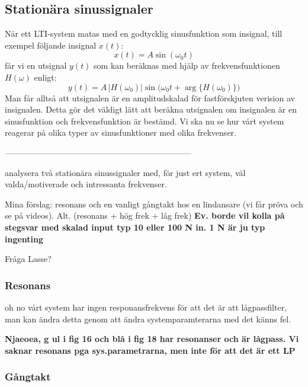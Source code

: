 \subsection{Stationära sinussignaler}
När ett LTI-system matas med en godtycklig sinusfunktion som insignal, till exempel följande insignal $x(t)$:
$$x(t)=A\sin(\omega_0t)$$
får vi en utsignal $y(t)$ som kan beräknas med hjälp av frekvensfunktionen $H(\omega)$ enligt:
$$y(t)=A\,\big|H(\omega_0)\big|\sin\big(\omega_0t+\arg\big\{H(\omega_0)\big\}\big)$$
Man får alltså att utsignalen är en amplitudskalad för fastförskjuten verision av insignalen.
Detta gör det väldigt lätt att beräkna utsignalen om insignalen är en sinusfunktion och frekvensfunktion är bestämd. Vi ska nu se hur vårt system reagerar på olika typer av sinusfunktioner med olika frekvenser.


--------------------------------------------------------------------

analysera två stationära sinussignaler  med, för just ert system, väl valda/motiverade och intressanta frekvenser.

Mina förslag: resonans och en vanligt gångtakt hos en lindansare (vi får pröva och se på videos). Alt. (resonans + hög frek + låg frek)
\textbf{Ev. borde vil kolla på stegsvar med skalad input typ 10 eller 100 N in. 1 N är ju typ ingenting}

Fråga Lasse?
\subsubsection{Resonans}
oh no vårt system har ingen responansfrekvens för att det är att lågpassfilter, man kan ändra detta genom att ändra systemparamterarna med det känns fel.

\textbf{Njaeoea, g  ul i fig 16 och blå i fig 18 har resonanser och är lågpass. Vi saknar resonans pga sys.parametrarna, men inte för att det är ett LP}
\subsubsection{Gångtakt}

\newpage
